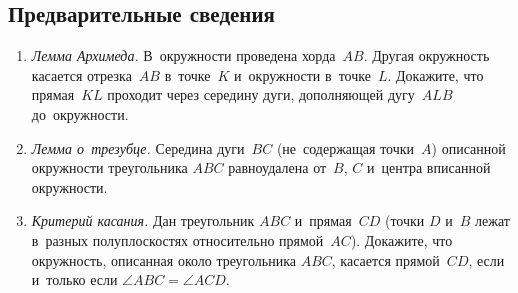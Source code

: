 


\subsection*{Предварительные сведения}

\begin{enumerate}


\item \emph{Лемма Архимеда.}
В~окружности проведена хорда~$AB$.
Другая окружность касается отрезка~$AB$ в~точке~$K$ и~окружности в~точке~$L$.
Докажите, что прямая~$KL$ проходит через середину дуги, дополняющей дугу~$ALB$
до~окружности.

\item \emph{Лемма о~трезубце.}
Середина дуги~$BC$ (не~содержащая точки~$A$) описанной окружности
треугольника $ABC$ равноудалена от~$B$, $C$ и~центра вписанной окружности.

\item \emph{Критерий касания.}
Дан треугольник $ABC$ и~прямая~$CD$
(точки $D$ и~$B$ лежат в~разных полуплоскостях относительно прямой~$AC$).
Докажите, что окружность, описанная около треугольника $ABC$, касается
прямой~$CD$, если и~только если $\angle ABC = \angle ACD$.



\end{enumerate}

